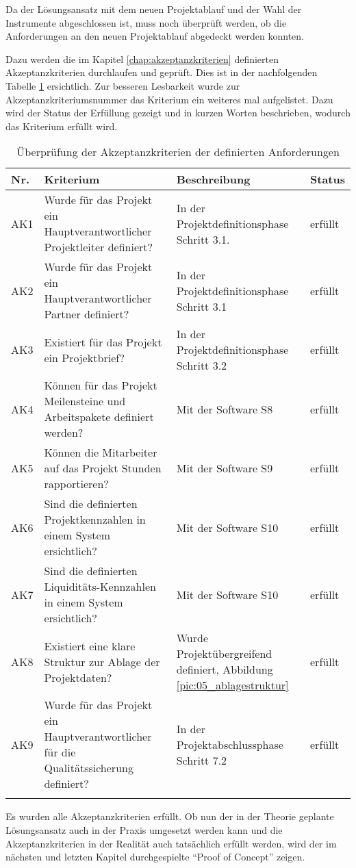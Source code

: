 Da der Lösungsansatz mit dem neuen Projektablauf und der Wahl der Instrumente
abgeschlossen ist, muss noch überprüft werden, ob die Anforderungen an den
neuen Projektablauf abgedeckt werden konnten.

Dazu werden die im Kapitel \ref{chap:akzeptanzkriterien} definierten 
Akzeptanzkriterien durchlaufen und geprüft. Dies ist in der nachfolgenden Tabelle 
\ref{tab:akzeptanzkriterien_test} ersichtlich. Zur besseren Lesbarkeit wurde zur 
Akzeptanzkriteriumsnummer das Kriterium ein weiteres mal aufgelistet. Dazu wird 
der Status der Erfüllung gezeigt und in kurzen Worten beschrieben, wodurch das
Kriterium erfüllt wird.

\begin{longtable}{lp{6cm}p{5cm}l}
    \toprule \textbf{Nr.} & \textbf{Kriterium} & \textbf{Beschreibung} & \textbf{Status} \\
    \midrule AK1 &
        Wurde für das Projekt ein Hauptverantwortlicher Projektleiter definiert? &
        In der Projektdefinitionsphase Schritt 3.1. &
        erfüllt \\
    \midrule AK2 &
        Wurde für das Projekt ein Hauptverantwortlicher Partner definiert? &
        In der Projektdefinitionsphase Schritt 3.1 &
        erfüllt \\
    \midrule AK3 &
        Existiert für das Projekt ein Projektbrief? &
        In der Projektdefinitionsphase Schritt 3.2 &
        erfüllt \\
    \midrule AK4 &
        Können für das Projekt Meilensteine und Arbeitspakete definiert werden? &
        Mit der Software S8 &
        erfüllt \\
    \midrule AK5 &
        Können die Mitarbeiter auf das Projekt Stunden rapportieren? &
        Mit der Software S9 &
        erfüllt \\
    \midrule AK6 &
        Sind die definierten Projektkennzahlen in einem System ersichtlich? &
        Mit der Software S10 &
        erfüllt \\
    \midrule AK7 &
        Sind die definierten Liquiditäts-Kennzahlen in einem System ersichtlich? &
        Mit der Software S10 &
        erfüllt \\
    \midrule AK8 &
        Existiert eine klare Struktur zur Ablage der Projektdaten? &
        Wurde Projektübergreifend definiert, Abbildung \ref{pic:05_ablagestruktur} &
        erfüllt \\
    \midrule AK9 &
        Wurde für das Projekt ein Hauptverantwortlicher für die Qualitätssicherung definiert? &
        In der Projektabschlussphase Schritt 7.2 &
        erfüllt \\
    \bottomrule
    \caption[Überprüfung der Akzeptanzkriterien der definierten Anforderungen]{Überprüfung 
        der Akzeptanzkriterien der definierten Anforderungen\footnotemark}
    \label{tab:akzeptanzkriterien_test}
\end{longtable}

Es wurden alle Akzeptanzkriterien erfüllt. Ob nun der in der Theorie geplante
Lösungsansatz auch in der Praxis umgesetzt werden kann und die Akzeptanzkriterien
in der Realität auch tatsächlich erfüllt werden, wird der im nächsten und
letzten Kapitel durchgespielte ``Proof of Concept'' zeigen.